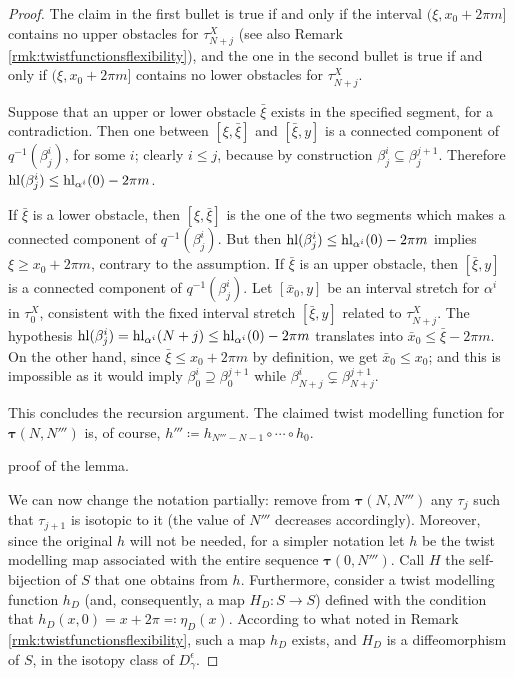 \begin{proof}
The claim in the first bullet is true if and only if the interval $(\xi,x_0+2\pi m]$ contains no upper obstacles for $\tau_{N+j}^X$ (see also Remark \ref{rmk:twistfunctionsflexibility}), and the one in the second bullet is true if and only if $(\xi,x_0+2\pi m]$ contains no lower obstacles for $\tau_{N+j}^X$.

Suppose that an upper or lower obstacle $\bar\xi$ exists in the specified segment, for a contradiction. Then one between $[\xi,\bar\xi]$ and $[\bar\xi, y]$ is a connected component of $q^{-1}(\beta_j^i)$, for some $i$; clearly $i\leq j$, because by construction $\beta_j^i\subseteq \beta_j^{j+1}$. Therefore $\mathrm{hl}(\beta_j^i) \leq \mathrm{hl}_{\alpha^i}(0)-2\pi m$.

If $\bar\xi$ is a lower obstacle, then $[\xi,\bar\xi]$ is the one of the two segments which makes a connected component of $q^{-1}(\beta_j^i)$. But then $\mathrm{hl}(\beta_j^i) \leq \mathrm{hl}_{\alpha^i}(0)-2\pi m$ implies $\xi\geq x_0+2\pi m$, contrary to the assumption. If $\bar\xi$ is an upper obstacle, then $[\bar\xi, y]$ is a connected component of $q^{-1}(\beta_j^i)$. Let $[\bar x_0,y]$ be an interval stretch for $\alpha^i$ in $\tau_0^X$, consistent with the fixed interval stretch $[\bar\xi, y]$ related to $\tau_{N+j}^X$. The hypothesis $\mathrm{hl}(\beta_j^i)=\mathrm{hl}_{\alpha^i}(N+j)\leq \mathrm{hl}_{\alpha^i}(0)-2\pi m$ translates into $\bar x_0 \leq \bar\xi -2\pi m$. On the other hand, since $\bar\xi\leq x_0+2\pi m$ by definition, we get $\bar x_0\leq x_0$; and this is impossible as it would imply $\beta_0^i\supseteq \beta_0^{j+1}$ while $\beta_{N+j}^i\subsetneq \beta_{N+j}^{j+1}$.

This concludes the recursion argument. The claimed twist modelling function for $\bm\tau(N,N''')$ is, of course, $h'''\coloneqq h_{N'''-N-1}\circ \cdots \circ h_0$.

 proof of the lemma.

We can now change the notation partially: remove from $\bm\tau(N,N''')$ any $\tau_j$ such that $\tau_{j+1}$ is isotopic to it (the value of $N'''$ decreases accordingly). Moreover, since the original $h$ will not be needed, for a simpler notation let $h$ be the twist modelling map associated with the entire sequence $\bm\tau(0,N''')$. Call $H$ the self-bijection of $S$ that one obtains from $h$. Furthermore, consider a twist modelling function $h_D$ (and, consequently, a map $H_D:S\rightarrow S$) defined with the condition that $h_D(x,0)=x+2\pi\eqqcolon \eta_D(x)$. According to what noted in Remark \ref{rmk:twistfunctionsflexibility}, such a map $h_D$ exists, and $H_D$ is a diffeomorphism of $S$, in the isotopy class of $D_\gamma^\epsilon$. 


\end{proof}
